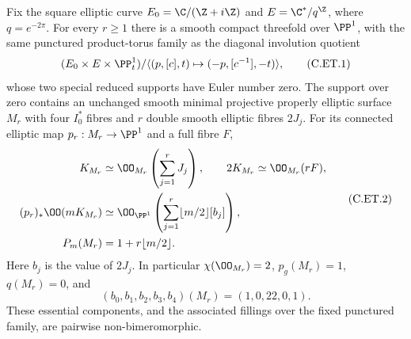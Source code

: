 \begin{proposition}\label{cdp:st:C.2.UN.30}

Fix the square elliptic curve
$E_0=\C/(\Z+i\Z)$ and $E=\C^*/q^{\Z}$,
where $q=e^{-2\pi}$. For every $r\ge1$ there is
a smooth compact threefold over $\PP^1$,
with the same punctured product-torus family
as the diagonal involution quotient
\[
 (E_0\times E\times\PP^1_t)/
      \langle(p,[c],t)\mapsto(-p,[c^{-1}],-t)\rangle,
                                                               \tag{C.ET.1}\label{cdp:eq:C.ET.1}
\]
whose two special reduced supports have Euler
number zero. The support over zero contains an
unchanged smooth minimal projective properly
elliptic surface $M_r$ with four $I_0^*$ fibres
and $r$ double smooth elliptic fibres $2J_j$.
For its connected elliptic map $p_r:M_r\to\PP^1$
and a full fibre $F$,
\[
 \begin{aligned}
 K_{M_r}&\simeq\OO_{M_r}\left(\sum_{j=1}^rJ_j\right),
 \qquad 2K_{M_r}\simeq\OO_{M_r}(rF),\\
 (p_r)_*\OO(mK_{M_r})
   &\simeq\OO_{\PP^1}\left(
                \sum_{j=1}^r\lfloor m/2\rfloor[b_j]\right),
 \\
 P_m(M_r)&=1+r\lfloor m/2\rfloor .
 \end{aligned}                                             \tag{C.ET.2}\label{cdp:eq:C.ET.2}
\]
Here $b_j$ is the value of $2J_j$. In particular
$\chi(\OO_{M_r})=2$, $p_g(M_r)=1$, $q(M_r)=0$,
and
\[
            (b_0,b_1,b_2,b_3,b_4)(M_r)
                         =(1,0,22,0,1).              \tag{C.ET.3}\label{cdp:eq:C.ET.3}
\]
These essential components, and the associated
fillings over the fixed punctured family, are
pairwise non-bimeromorphic.


\end{proposition}
